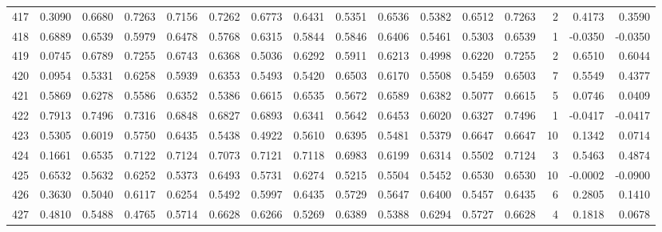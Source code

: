 \begin{tabular}{lrrrrrrrrrrrrrrr}
417 &      0.3090 &  0.6680 &  0.7263 &  0.7156 &  0.7262 &  0.6773 &  0.6431 &  0.5351 &  0.6536 &  0.5382 &   0.6512 &     0.7263 &      2 &                    0.4173 &                     0.3590 \\
418 &      0.6889 &  0.6539 &  0.5979 &  0.6478 &  0.5768 &  0.6315 &  0.5844 &  0.5846 &  0.6406 &  0.5461 &   0.5303 &     0.6539 &      1 &                   -0.0350 &                    -0.0350 \\
419 &      0.0745 &  0.6789 &  0.7255 &  0.6743 &  0.6368 &  0.5036 &  0.6292 &  0.5911 &  0.6213 &  0.4998 &   0.6220 &     0.7255 &      2 &                    0.6510 &                     0.6044 \\
420 &      0.0954 &  0.5331 &  0.6258 &  0.5939 &  0.6353 &  0.5493 &  0.5420 &  0.6503 &  0.6170 &  0.5508 &   0.5459 &     0.6503 &      7 &                    0.5549 &                     0.4377 \\
421 &      0.5869 &  0.6278 &  0.5586 &  0.6352 &  0.5386 &  0.6615 &  0.6535 &  0.5672 &  0.6589 &  0.6382 &   0.5077 &     0.6615 &      5 &                    0.0746 &                     0.0409 \\
422 &      0.7913 &  0.7496 &  0.7316 &  0.6848 &  0.6827 &  0.6893 &  0.6341 &  0.5642 &  0.6453 &  0.6020 &   0.6327 &     0.7496 &      1 &                   -0.0417 &                    -0.0417 \\
423 &      0.5305 &  0.6019 &  0.5750 &  0.6435 &  0.5438 &  0.4922 &  0.5610 &  0.6395 &  0.5481 &  0.5379 &   0.6647 &     0.6647 &     10 &                    0.1342 &                     0.0714 \\
424 &      0.1661 &  0.6535 &  0.7122 &  0.7124 &  0.7073 &  0.7121 &  0.7118 &  0.6983 &  0.6199 &  0.6314 &   0.5502 &     0.7124 &      3 &                    0.5463 &                     0.4874 \\
425 &      0.6532 &  0.5632 &  0.6252 &  0.5373 &  0.6493 &  0.5731 &  0.6274 &  0.5215 &  0.5504 &  0.5452 &   0.6530 &     0.6530 &     10 &                   -0.0002 &                    -0.0900 \\
426 &      0.3630 &  0.5040 &  0.6117 &  0.6254 &  0.5492 &  0.5997 &  0.6435 &  0.5729 &  0.5647 &  0.6400 &   0.5457 &     0.6435 &      6 &                    0.2805 &                     0.1410 \\
427 &      0.4810 &  0.5488 &  0.4765 &  0.5714 &  0.6628 &  0.6266 &  0.5269 &  0.6389 &  0.5388 &  0.6294 &   0.5727 &     0.6628 &      4 &                    0.1818 &                     0.0678 \\

\end{tabular}
